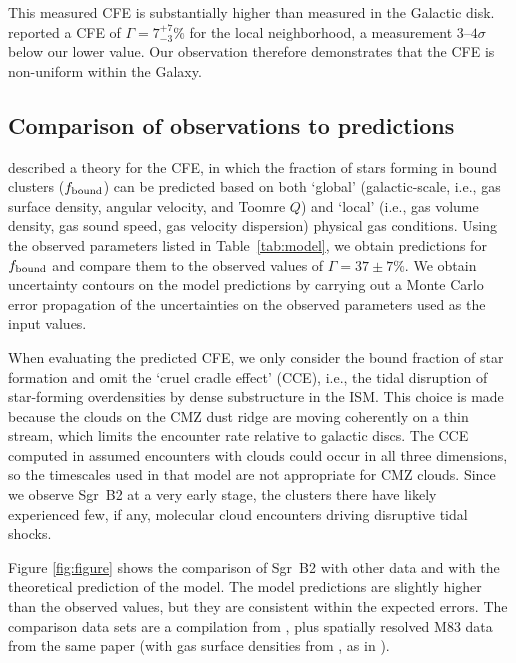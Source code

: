 \documentclass[twocolumn]{aastex62}
\begin{document}
This measured CFE is substantially higher than measured in the Galactic disk.
\citet{Lada2003a} reported a CFE of $\Gamma=7^{+7}_{-3}\%$ for the local neighborhood, a
measurement $3$--$4\sigma$ below our lower value.  Our observation therefore demonstrates
that the CFE is non-uniform within the Galaxy.

\subsection{Comparison of observations to predictions}
\citet{Kruijssen2012a} described a theory for the CFE, in which the fraction
of stars forming in bound clusters ($f_{\rm bound}$) can be predicted based on both
`global' (galactic-scale, i.e., gas surface density, angular velocity, and
Toomre $Q$) and `local' (i.e., gas volume density, gas sound speed, gas
velocity dispersion) physical gas conditions. Using the observed parameters
listed in Table~\ref{tab:model}, we obtain predictions for $f_{\rm bound}$ and
compare them to the observed values of $\Gamma=37\pm7\%$. We obtain uncertainty
contours on the model predictions by carrying out a Monte Carlo error
propagation of the uncertainties on the observed parameters used as the input
values.

When evaluating the predicted CFE, we only consider the bound fraction of star formation
and omit the `cruel cradle effect' (CCE), i.e., the tidal disruption of
star-forming overdensities by dense substructure in the ISM. This choice is
made because the clouds on the CMZ dust ridge are moving coherently on a thin
stream, which limits the encounter rate relative to galactic discs.  The CCE
computed in \citet{Kruijssen2012a} assumed encounters with clouds could occur
in all three dimensions, so the timescales used in that model are not
appropriate for CMZ clouds.  Since we observe Sgr~B2 at a very early stage, the
clusters there have likely experienced few, if any, molecular cloud encounters
driving disruptive tidal shocks.

Figure \ref{fig:figure} shows the comparison of Sgr~B2 with other data and with
the theoretical prediction of the \citet{Kruijssen2012a} model. The model
predictions are slightly higher than the observed values, but they are
consistent within the expected errors. The comparison data sets are a
compilation from \citet{Adamo2015a}, plus spatially resolved M83 data
from the same paper (with gas surface densities from
\citealt{Freeman2017a}, as in \citealt{Reina-Campos2017a}).
\end{document}
